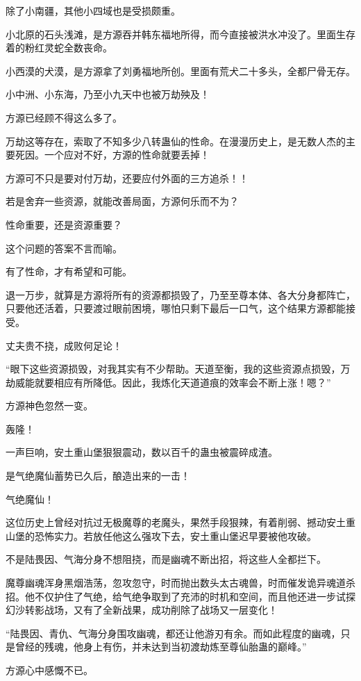 \begin{this_body}
除了小南疆，其他小四域也是受损颇重。

小北原的石头浅滩，是方源吞并韩东福地所得，而今直接被洪水冲没了。里面生存着的粉红灵蛇全数丧命。

小西漠的犬漠，是方源拿了刘勇福地所创。里面有荒犬二十多头，全都尸骨无存。

小中洲、小东海，乃至小九天中也被万劫殃及！

方源已经顾不得这么多了。

万劫这等存在，索取了不知多少八转蛊仙的性命。在漫漫历史上，是无数人杰的主要死因。一个应对不好，方源的性命就要丢掉！

方源可不只是要对付万劫，还要应付外面的三方追杀！！

若是舍弃一些资源，就能改善局面，方源何乐而不为？

性命重要，还是资源重要？

这个问题的答案不言而喻。

有了性命，才有希望和可能。

退一万步，就算是方源将所有的资源都损毁了，乃至至尊本体、各大分身都阵亡，只要他还活着，只要渡过眼前困境，哪怕只剩下最后一口气，这个结果方源都能接受。

丈夫贵不挠，成败何足论！

“眼下这些资源损毁，对我其实有不少帮助。天道至衡，我的这些资源点损毁，万劫威能就要相应有所降低。因此，我炼化天道道痕的效率会不断上涨！嗯？”

方源神色忽然一变。

轰隆！

一声巨响，安土重山堡狠狠震动，数以百千的蛊虫被震碎成渣。

是气绝魔仙蓄势已久后，酿造出来的一击！

气绝魔仙！

这位历史上曾经对抗过无极魔尊的老魔头，果然手段狠辣，有着削弱、撼动安土重山堡的恐怖实力。若放任他这么强攻下去，安土重山堡迟早要被他攻破。

不是陆畏因、气海分身不想阻挠，而是幽魂不断出招，将这些人全都拦下。

魔尊幽魂浑身黑烟浩荡，忽攻忽守，时而抛出数头太古魂兽，时而催发诡异魂道杀招。他不仅护住了气绝，给气绝争取到了充沛的时机和空间，而且他还进一步试探幻沙转影战场，又有了全新战果，成功削除了战场又一层变化！

“陆畏因、青仇、气海分身围攻幽魂，都还让他游刃有余。而如此程度的幽魂，只是曾经的残魂，他身上有伤，并未达到当初渡劫炼至尊仙胎蛊的巅峰。”

方源心中感慨不已。


\end{this_body}
